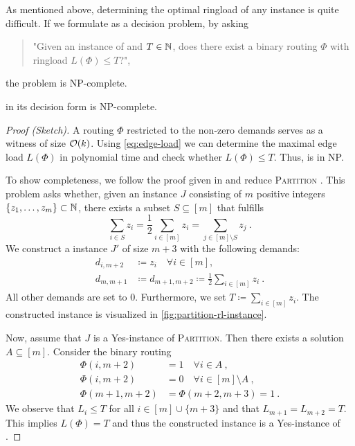 As mentioned above, determining the optimal ringload of any \RL instance is quite difficult.
If we formulate \RL as a decision problem, by asking
\begin{quote}
	"Given an instance of \RL and $T \in \mathbb{N}$, does there exist a binary routing $\Phi$ with ringload $L(\Phi) \leq T$?",
\end{quote}
the problem is NP-complete.
\begin{theorem}
	\RL in its decision form is NP-complete.
\end{theorem}
\begin{proof}[Proof (Sketch)]
	A routing $\Phi$ restricted to the non-zero demands serves as a witness of size $\mathcal{O}(k)$.
	Using \cref{eq:edge-load} we can determine the maximal edge load $L(\Phi)$ in polynomial time and check whether $L(\Phi) \leq T$.
	Thus, \RL is in NP.
	
	To show completeness, we follow the proof given in \cite{schrijver99} and reduce \textsc{Partition} \cite{karp72}.
	This problem asks whether, given an instance $J$ consisting of $m$ positive integers $\{z_1, \ldots, z_m\} \subset \mathbb{N}$, there exists a subset $S \subseteq [m]$ that fulfills
	\begin{equation}
		\sum_{i \in S} z_i = \frac{1}{2}  \sum_{i \in [m]} z_i = \sum_{j \in [m] \setminus S} z_j\ .
	\end{equation}
	We construct a \RL instance $J'$ of size $m + 3$ with the following demands:
	\begin{align}
			d_{i, m+2} &\coloneqq z_i \quad \forall i \in [m], \\
			d_{m, m+1} &\coloneqq d_{m+1, m+2} \coloneqq \frac{1}{2}  \sum_{i \in [m]} z_i \ . 
	\end{align}
	All other demands are set to $0$.
	Furthermore, we set $T \coloneqq \sum_{i \in [m]} z_i$.
	The constructed instance is visualized in \cref{fig:partition-rl-instance}.
	
	Now, assume that $J$ is a Yes-instance of \textsc{Partition}.
	Then there exists a solution $A \subseteq [m]$.
	Consider the binary routing
	\begin{align}
		\Phi(i, m+2) &= 1 \quad \forall i \in A \ , \\
		\Phi(i, m+2) &= 0 \quad \forall i \in [m] \setminus A \ ,	 \\
		\Phi(m+1, m+2) & = \Phi(m+2, m+3) = 1 \ .
	\end{align}
	We observe that $L_i \leq T$ for all $i \in [m] \cup \{m+3\}$ and that $L_{m+1} = L_{m+2} = T$.
	This implies $L(\Phi) = T$ and thus the constructed instance is a Yes-instance of \RL.
	

\end{proof}
